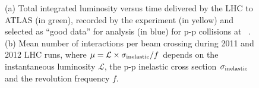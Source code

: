 \begin{figure}[tb]\begin{center}
	\caption{(a) Total integrated luminosity versus time delivered by the LHC to ATLAS (in green), recorded by the experiment 
        (in yellow) and selected as ``good data'' for analysis (in blue) for p-p collisions at ~\tev.
        (b) Mean number of interactions per beam crossing during 2011 and 2012 LHC runs, where 
        $\mu = \mathcal L\times \sigma_{\rm inelastic}/f$ depends on the instantaneous luminosity $\mathcal L$, the p-p inelastic
        cross section $\sigma_{\rm inelastic}$ and the revolution frequency $f$.~\cite{lumi}}
\end{center}\end{figure}

